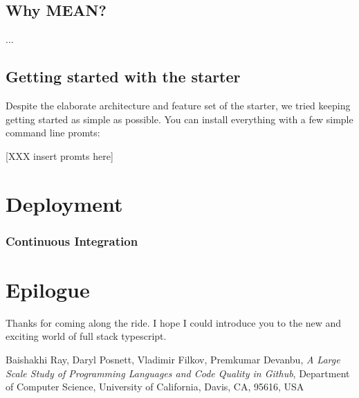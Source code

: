 \documentclass[12pt,a4paper]{report}
\begin{document}
\section{Why MEAN?}
...

\section {Getting started with the starter}
Despite the elaborate architecture and feature set of the starter, we tried keeping getting started as simple as possible. You can install everything with a few simple command line promts:

[XXX insert promts here]

\chapter{Deployment}

\subsection{Continuous Integration}

\chapter{Epilogue}

Thanks for coming along the ride. I hope I could introduce you to the new and exciting world of full stack typescript.

\begin{thebibliography}{9}

  Baishakhi Ray, Daryl Posnett, Vladimir Filkov, Premkumar Devanbu,
  \textit{A Large Scale Study of Programming Languages
and Code Quality in Github},
  Department of Computer Science, University of California, Davis, CA, 95616, USA

\end{thebibliography}
\end{document}
